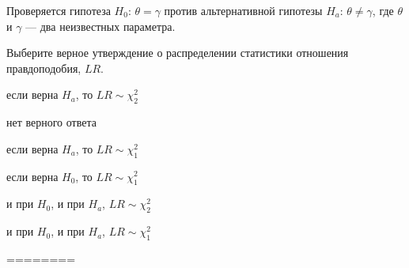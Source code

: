 
\begin{question}
Проверяется гипотеза \(H_0\): \(\theta = \gamma\) против альтернативной
гипотезы \(H_a\): \(\theta \neq \gamma\), где \(\theta\) и \(\gamma\)
--- два неизвестных параметра.

Выберите верное утверждение о распределении статистики отношения
правдоподобия, \(LR\).
\begin{answerlist}
  \item если верна \(H_a\), то \(LR \sim \chi_2^2\)
  \item нет верного ответа
  \item если верна \(H_a\), то \(LR \sim \chi_1^2\)
  \item если верна \(H_0\), то \(LR \sim \chi_1^2\)
  \item и при \(H_0\), и при \(H_a\), \(LR \sim \chi_2^2\)
  \item и при \(H_0\), и при \(H_a\), \(LR \sim \chi_1^2\)
\end{answerlist}
\end{question}

\begin{solution}
========
\end{solution}


